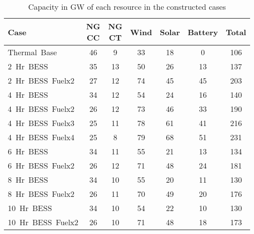 \begin{table}[htp]
\centering
\begin{tabular}{lcccccc}
\hline
\textbf{Case} & \textbf{NG CC} & \textbf{NG CT} & \textbf{Wind} & \textbf{Solar} & \textbf{Battery} & \textbf{Total} \\ \hline
Thermal\ Base & 46 & 9 & 33 & 18 & 0 & 106 \\
2\ Hr\ BESS & 35 & 13 & 50 & 26 & 13 & 137 \\
2\ Hr\ BESS\ Fuelx2 & 27 & 12 & 74 & 45 & 45 & 203 \\
4\ Hr\ BESS & 34 & 12 & 54 & 24 & 16 & 140 \\
4\ Hr\ BESS\ Fuelx2 & 26 & 12 & 73 & 46 & 33 & 190 \\
4\ Hr\ BESS\ Fuelx3 & 25 & 11 & 78 & 61 & 41 & 216 \\
4\ Hr\ BESS\ Fuelx4 & 25 & 8 & 79 & 68 & 51 & 231 \\
6\ Hr\ BESS & 34 & 11 & 55 & 21 & 13 & 134 \\
6\ Hr\ BESS\ Fuelx2 & 26 & 12 & 71 & 48 & 24 & 181 \\
8\ Hr\ BESS & 34 & 10 & 55 & 20 & 11 & 130 \\
8\ Hr\ BESS\ Fuelx2 & 26 & 11 & 70 & 49 & 20 & 176 \\
10\ Hr\ BESS & 34 & 10 & 54 & 22 & 10 & 130 \\
10\ Hr\ BESS\ Fuelx2 & 26 & 10 & 71 & 48 & 18 & 173 \\
\hline
\end{tabular}
\caption{Capacity in GW of each resource in the constructed cases}
\label{table:all_cases}
\end{table}
